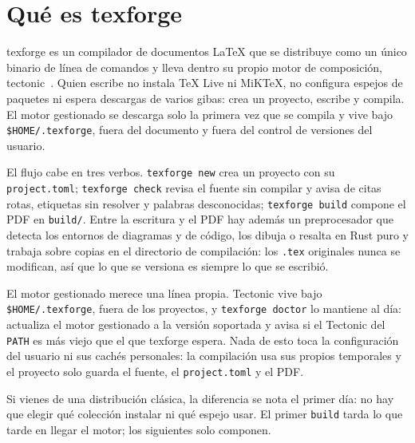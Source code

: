 \section{Qué es texforge}\label{sec:que-es}

texforge es un compilador de documentos \LaTeX{} que se distribuye como un
único binario de línea de comandos y lleva dentro su propio motor de
composición, tectonic~\cite{tectonic}. Quien escribe no instala TeX Live ni
MiKTeX, no configura espejos de paquetes ni espera descargas de varios
gibas: crea un proyecto, escribe y compila. El motor gestionado se descarga
solo la primera vez que se compila y vive bajo \texttt{\$HOME/.texforge},
fuera del documento y fuera del control de versiones del usuario.

El flujo cabe en tres verbos. \texttt{texforge new} crea un proyecto con su
\texttt{project.toml}; \texttt{texforge check} revisa el fuente sin compilar
y avisa de citas rotas, etiquetas sin resolver y palabras desconocidas;
\texttt{texforge build} compone el PDF en \texttt{build/}. Entre la
escritura y el PDF hay además un preprocesador que detecta los entornos de
diagramas y de código, los dibuja o resalta en Rust puro y trabaja sobre
copias en el directorio de compilación: los \texttt{.tex} originales nunca
se modifican, así que lo que se versiona es siempre lo que se escribió.

El motor gestionado merece una línea propia. Tectonic vive bajo
\texttt{\$HOME/.texforge}, fuera de los proyectos, y \texttt{texforge
  doctor} lo mantiene al día: actualiza el motor gestionado a la versión
soportada y avisa si el Tectonic del \texttt{PATH} es más viejo que el que
texforge espera. Nada de esto toca la configuración del usuario ni sus
cachés personales: la compilación usa sus propios temporales y el proyecto
solo guarda el fuente, el \texttt{project.toml} y el PDF.

\begin{notebox}
  Si vienes de una distribución clásica, la diferencia se nota el primer
  día: no hay que elegir qué colección instalar ni qué espejo usar.
  El primer \texttt{build} tarda lo que tarde en llegar el motor; los
  siguientes solo componen.
\end{notebox}

